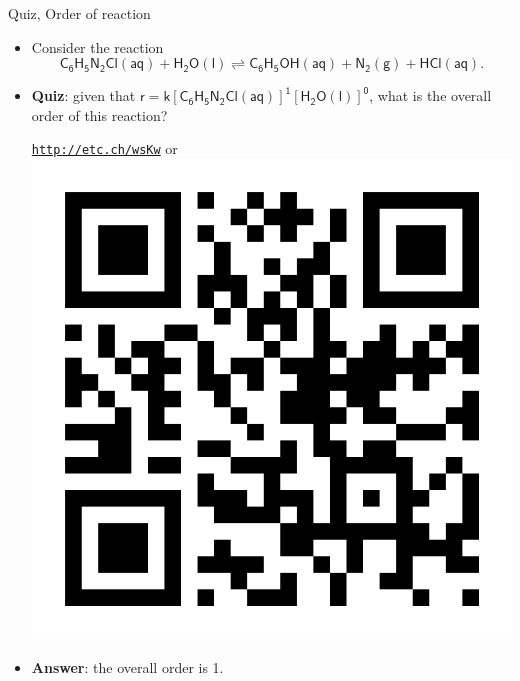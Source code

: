 \begin{frame}{Quiz, Order of reaction}
	
	\begin{itemize}
		\item Consider the reaction 
		$$\mathsf{
		C_{6}H_{5}N_{2}Cl(aq) + H_{2}O (l) 
        \rightleftharpoons
        C_{6}H_{5}OH(aq) + N_{2}(g) + HCl(aq)}.$$
		\item 
		\alert{\bf Quiz}: given that $\mathsf{r = k [C_{6}H_{5}N_{2}Cl(aq)]^1 [H_{2}O(l)]^0}$, what is the overall order of this reaction?
		\vskip 5pt
		\begin{center}
    	\href{http://etc.ch/wsKw}{\textcolor{indigo(dye)}{\tt http://etc.ch/wsKw}} \quad
			or 
		    \quad	\includegraphics[height=0.12\columnwidth]{figures/chemical-kinetics/polls.png}
		\end{center}
		\hiddenpause 
		\vskip 10pt
 		\item \alert{\bf Answer}: the overall order is 1.
	\end{itemize}
\end{frame}
%
